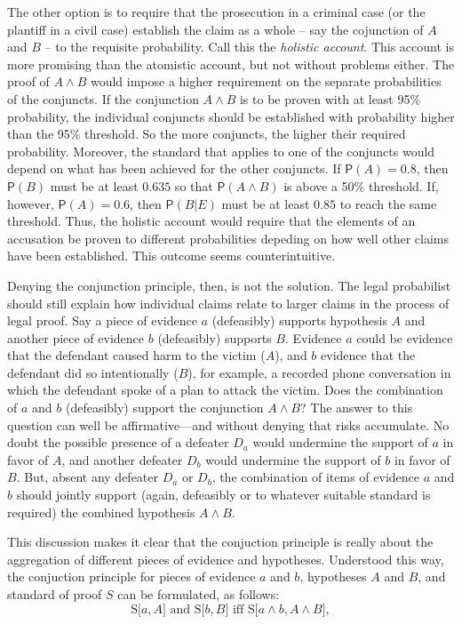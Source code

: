 \documentclass[10pt,dvipsnames,enabledeprecatedfontcommands]{scrartcl}
\newcommand{\et}{\wedge}
\newcommand{\pr}[1]{\mathsf{P}(#1)}
\begin{document}
The other option is to require that the prosecution in a criminal case
(or the plantiff in a civil case) establish the claim as a whole -- say
the cojunction of \(A\) and \(B\) -- to the requisite probability. Call
this the \textit{holistic account}. This account is more promising than
the atomistic account, but not without problems either. The proof of
\(A\et B\) would impose a higher requirement on the separate
probabilities of the conjuncts. If the conjunction \(A\et B\) is to be
proven with at least 95\% probability, the individual conjuncts should
be established with probability higher than the 95\% threshold. So the
more conjuncts, the higher their required probability. Moreover, the
standard that applies to one of the conjuncts would depend on what has
been achieved for the other conjuncts. If \(\pr{A}=0.8\), then
\(\pr{B}\) must be at least \(0.635\) so that \(\pr{A\et B}\) is above a
50\% threshold. If, however, \(\pr{A}=0.6\), then \(\pr{B\vert E}\) must
be at least \(0.85\) to reach the same threshold. Thus, the holistic
account would require that the elements of an accusation be proven to
different probabilities depeding on how well other claims have been
established. This outcome seems counterintuitive.

Denying the conjunction principle, then, is not the solution. The legal
probabilist should still explain how individual claims relate to larger
claims in the process of legal proof. Say a piece of evidence \(a\)
(defeasibly) supports hypothesis \(A\) and another piece of evidence
\(b\) (defeasibly) supports \(B\). Evidence \(a\) could be evidence that
the defendant caused harm to the victim (\(A\)), and \(b\) evidence that
the defendant did so intentionally (\(B\)), for example, a recorded
phone conversation in which the defendant spoke of a plan to attack the
victim. Does the combination of \(a\) and \(b\) (defeasibly) support the
conjunction \(A \et B\)? The answer to this question can well be
affirmative---and without denying that risks accumulate. No doubt the
possible presence of a defeater \(D_a\) would undermine the support of
\(a\) in favor of \(A\), and another defeater \(D_b\) would undermine
the support of \(b\) in favor of \(B\). But, absent any defeater \(D_a\)
or \(D_b\), the combination of items of evidence \(a\) and \(b\) should
jointly support (again, defeasibly or to whatever suitable standard is
required) the combined hypothesis \(A \wedge B\).

This discussion makes it clear that the conjuction principle is really
about the aggregation of different pieces of evidence and hypotheses.
Understood this way, the conjuction principle for pieces of evidence
\(a\) and \(b\), hypotheses \(A\) and \(B\), and standard of proof \(S\)
can be formulated, as follows:
\[\text{S[$a, A$] and S[$b, B$] iff S[$a \wedge b, A\wedge B$]},\]
\end{document}
